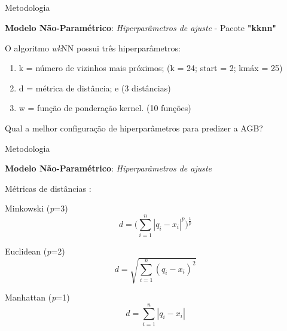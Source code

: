\documentclass[12pt,ignorenonframetext,aspectratio=1610]{beamer}
\begin{document}
\subsection[Modelo Não-Paramétrico]{}
\transwipe
\begin{frame}[t]{Metodologia}

\justifying
\textbf{{\footnotesize Modelo Não-Paramétrico}}: \textit{Hiperparâmetros de ajuste} - \footnotesize{Pacote \textbf{"kknn"} \cite{R-kknn}} \newline

O algoritmo \textit{wk}NN possui três hiperparâmetros: \newline
 
	\begin{enumerate}
 	
\item <1-> k = número de vizinhos mais próximos; (k = 24; start = 2; kmáx = 25)

\item <2-> d = métrica de distância; e (3 distâncias)

\item <3-> w = função de ponderação kernel. (10 funções) \newline 

	\end{enumerate}
	
Qual a melhor configuração de hiperparâmetros para predizer a AGB?

\end{frame}
\transwipe
\begin{frame}[t]{Metodologia}

\textbf{Modelo Não-Paramétrico}: \textit{Hiperparâmetros de ajuste} \newline

Métricas de distâncias \cite{zhao2016improvement}: \newline

Minkowski (\textit{p}=3)
\begin{equation}
d = {\Bigg(\displaystyle\sum\limits_{i=1}^n |q_i-x_i|^p\Bigg)^\frac{1}{p}}
\end{equation}

Euclidean (\textit{p}=2)
\begin{equation}
d = \sqrt{\displaystyle\sum\limits_{i=1}^n (q_i-x_i)^2}
\end{equation}

Manhattan (\textit{p}=1)
\begin{equation}
d = {\displaystyle\sum\limits_{i=1}^n |q_i-x_i|}
\end{equation}

\end{frame}
\end{document}
